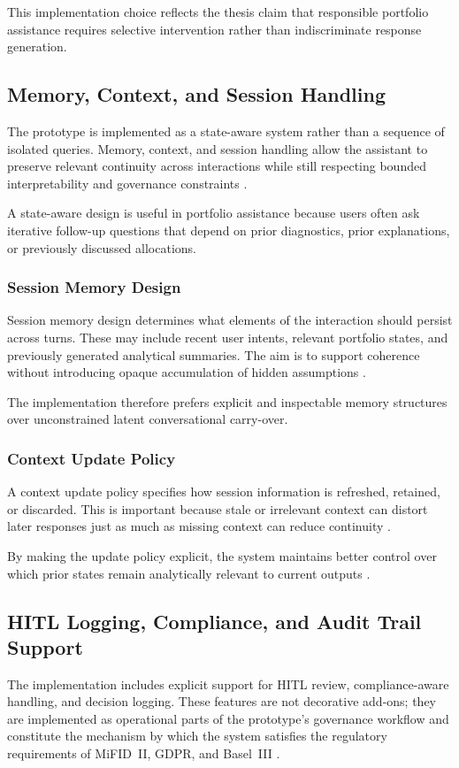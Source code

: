 \documentclass[11pt]{article}
\begin{document}
This implementation choice reflects the thesis claim that responsible portfolio assistance requires selective intervention rather than indiscriminate response generation.

\subsection{Memory, Context, and Session Handling}
The prototype is implemented as a state-aware system rather than a sequence of isolated queries. Memory, context, and session handling allow the assistant to preserve relevant continuity across interactions while still respecting bounded interpretability and governance constraints \cite{yu2023,wu2023}.

A state-aware design is useful in portfolio assistance because users often ask iterative follow-up questions that depend on prior diagnostics, prior explanations, or previously discussed allocations.

\subsubsection{Session Memory Design}
Session memory design determines what elements of the interaction should persist across turns. These may include recent user intents, relevant portfolio states, and previously generated analytical summaries. The aim is to support coherence without introducing opaque accumulation of hidden assumptions \cite{yu2023,ji2023}.

The implementation therefore prefers explicit and inspectable memory structures over unconstrained latent conversational carry-over.

\subsubsection{Context Update Policy}
A context update policy specifies how session information is refreshed, retained, or discarded. This is important because stale or irrelevant context can distort later responses just as much as missing context can reduce continuity \cite{wu2023,white2000}.

By making the update policy explicit, the system maintains better control over which prior states remain analytically relevant to current outputs \cite{gdpr2016,adadi2018}.

\subsection{HITL Logging, Compliance, and Audit Trail Support}
The implementation includes explicit support for HITL review, compliance-aware handling, and decision logging. These features are not decorative add-ons; they are implemented as operational parts of the prototype's governance workflow and constitute the mechanism by which the system satisfies the regulatory requirements of MiFID~II, GDPR, and Basel~III \cite{amershi2014,holzinger2016,mifid2014}.
\end{document}
